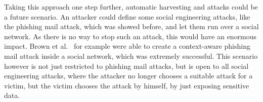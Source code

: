 Taking this approach one step further, automatic harvesting and attacks could
be a future scenario. An attacker could define some social engineering attacks,
like the phishing mail attack, which was showed before, and let them run over a
social network. As there is no way to stop such an attack, this would have an
enormous impact. Brown et al.~\cite{brown2008} for example were able to create
a context-aware phishing mail attack inside a social network, which was
extremely successful. This scenario however is not just restricted to phishing
mail attacks, but is open to all social engineering attacks, where the attacker
no longer chooses a suitable attack for a victim, but the victim chooses the
attack by himself, by just exposing sensitive data.
